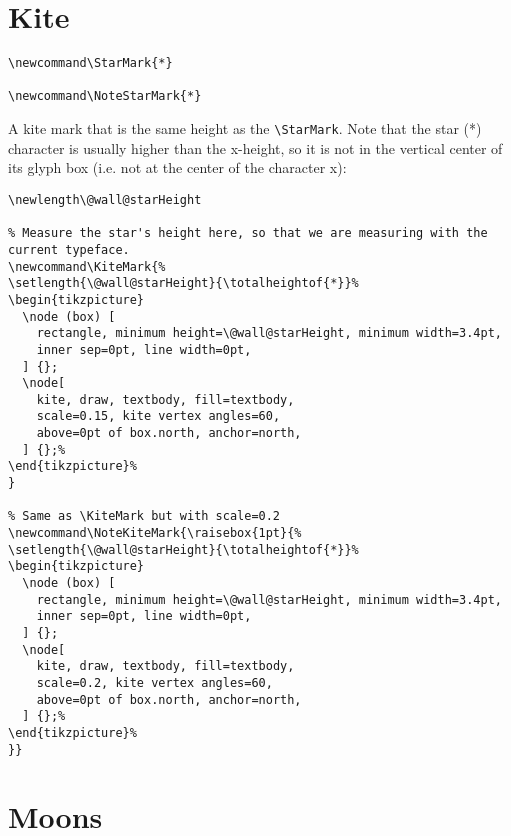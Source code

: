 \documentclass[11pt,oneside]{memoir-article}
\begin{document}
\section{Kite}
\label{sec:orgfca0369}

\begin{verbatim}
\newcommand\StarMark{*}

\newcommand\NoteStarMark{*}
\end{verbatim}

A kite mark that is the same height as the \texttt{\textbackslash{}StarMark}. Note that the star (*)
character is usually higher than the x-height, so it is not in the vertical
center of its glyph box (i.e. not at the center of the character x):

 \frame{*}

\begin{verbatim}
\newlength\@wall@starHeight

% Measure the star's height here, so that we are measuring with the current typeface.
\newcommand\KiteMark{%
\setlength{\@wall@starHeight}{\totalheightof{*}}%
\begin{tikzpicture}
  \node (box) [
    rectangle, minimum height=\@wall@starHeight, minimum width=3.4pt,
    inner sep=0pt, line width=0pt,
  ] {};
  \node[
    kite, draw, textbody, fill=textbody,
    scale=0.15, kite vertex angles=60,
    above=0pt of box.north, anchor=north,
  ] {};%
\end{tikzpicture}%
}

% Same as \KiteMark but with scale=0.2
\newcommand\NoteKiteMark{\raisebox{1pt}{%
\setlength{\@wall@starHeight}{\totalheightof{*}}%
\begin{tikzpicture}
  \node (box) [
    rectangle, minimum height=\@wall@starHeight, minimum width=3.4pt,
    inner sep=0pt, line width=0pt,
  ] {};
  \node[
    kite, draw, textbody, fill=textbody,
    scale=0.2, kite vertex angles=60,
    above=0pt of box.north, anchor=north,
  ] {};%
\end{tikzpicture}%
}}
\end{verbatim}

\section{Moons}
\label{sec:orge43381e}
\end{document}
